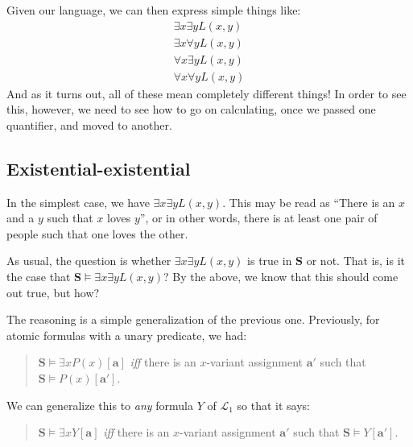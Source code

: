 \begin{center}
\end{center}

Given our language, we can then express simple things like:
\begin{gather}
 \exists x \exists y L(x, y)\\
 \exists x \forall y L(x, y)\\
 \forall x \exists yL(x,y)\\
 \forall x \forall y L(x, y)
\end{gather}
And as it turns out, all of these mean completely different things! In order to see this, however, we need to see how to go on calculating, once we passed one quantifier, and moved to another. 

\subsection{Existential-existential}

In the simplest case, we have $\exists x \exists y L(x,y)$. This may be read as ``There is an $x$ and a $y$ such that $x$ loves $y$'', or in other words, there is at least one pair of people such that one loves the other. 

As usual, the question is whether $\exists x \exists y L(x, y)$ is true in $\mathbf{S}$ or not. That is, is it the case that $\mathbf{S} \models \exists x \exists y L(x, y)$? By the above, we know that this should come out true, but how? 

The reasoning is a simple generalization of the previous one. Previously, for atomic formulas with a unary predicate, we had: 

\begin{quote}
	$\mathbf{S} \models \exists x P(x)[\mathbf{a}]$ \textit{iff} there is an $x$-variant assignment $\mathbf{a}'$ such that $\mathbf{S} \models P(x)[\mathbf{a}']$. 
\end{quote}
%
We can generalize this to \textit{any} formula $Y$ of $\mathcal{L}_1$ so that it says:
%
\begin{quote}
	$\mathbf{S} \models \exists x Y[\mathbf{a}]$ \textit{iff} there is an $x$-variant assignment $\mathbf{a}'$ such that $\mathbf{S} \models Y[\mathbf{a}']$. 
\end{quote}

